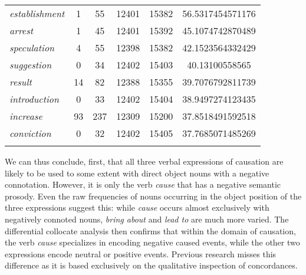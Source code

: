 \begin{table}
{\begin{tabular}[t]{l *{4}{S[table-format=5]} S}
\textit{establishment} & 1 & 55 & 12401 & 15382 & 56.5317454571176 \\
\textit{arrest} & 1 & 45 & 12401 & 15392 & 45.1074742870489 \\
\textit{speculation} & 4 & 55 & 12398 & 15382 & 42.1523564332429 \\
\textit{suggestion} & 0 & 34 & 12402 & 15403 & 40.13100558565 \\
\textit{result} & 14 & 82 & 12388 & 15355 & 39.7076792811739 \\
\textit{introduction} & 0 & 33 & 12402 & 15404 & 38.9497274123435 \\
\textit{increase} & 93 & 237 & 12309 & 15200 & 37.8518491592518 \\
\textit{conviction} & 0 & 32 & 12402 & 15405 & 37.7685071485269 \\
\lspbottomrule
\end{tabular}}
\end{table}

We can thus conclude, first, that all three verbal  expressions of causation are likely to be used to some extent with direct object nouns  with a negative connotation.  However, it is only the verb \textit{cause} that has a negative semantic  prosody. Even the raw frequencies  of nouns occurring in the object position of the three expressions suggest this: while \textit{cause} occurs almost exclusively with negatively connoted  nouns, \textit{bring about} and \textit{lead to} are much more varied. The differential collocate  analysis then confirms that within the domain of causation, the verb  \textit{cause} specializes in encoding negative caused events, while the other two expressions encode neutral or positive events. Previous research \citep{louw_semantic_2010} misses this difference as it is based exclusively on the qualitative  inspection of  concordances.

